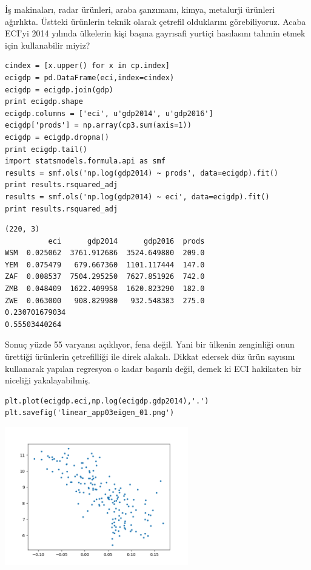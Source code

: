 \documentclass[12pt,fleqn]{article}\usepackage{../../common}
\begin{document}
İş makinaları, radar ürünleri, araba şanzımanı, kimya, metalurji ürünleri
ağırlıkta. Üstteki ürünlerin teknik olarak çetrefil olduklarını
görebiliyoruz. Acaba ECI'yi 2014 yılında ülkelerin kişi başına gayrısafi
yurtiçi hasılasını tahmin etmek için kullanabilir miyiz?

\begin{verbatim}
cindex = [x.upper() for x in cp.index]
ecigdp = pd.DataFrame(eci,index=cindex)
ecigdp = ecigdp.join(gdp)
print ecigdp.shape
ecigdp.columns = ['eci', u'gdp2014', u'gdp2016']
ecigdp['prods'] = np.array(cp3.sum(axis=1))
ecigdp = ecigdp.dropna()
print ecigdp.tail()
import statsmodels.formula.api as smf
results = smf.ols('np.log(gdp2014) ~ prods', data=ecigdp).fit()
print results.rsquared_adj
results = smf.ols('np.log(gdp2014) ~ eci', data=ecigdp).fit()
print results.rsquared_adj
\end{verbatim}

\begin{verbatim}
(220, 3)
          eci      gdp2014      gdp2016  prods
WSM  0.025062  3761.912686  3524.649880  209.0
YEM  0.075479   679.667360  1101.117444  147.0
ZAF  0.008537  7504.295250  7627.851926  742.0
ZMB  0.048409  1622.409958  1620.823290  182.0
ZWE  0.063000   908.829980   932.548383  275.0
0.230701679034
0.55503440264
\end{verbatim}

Sonuç yüzde 55 varyansı açıklıyor, fena değil. Yani bir ülkenin zenginliği
onun ürettiği ürünlerin çetrefilliği ile direk alakalı. Dikkat edersek düz
ürün sayısını kullanarak yapılan regresyon o kadar başarılı değil, demek ki
ECI hakikaten bir niceliği yakalayabilmiş.

\begin{verbatim}
plt.plot(ecigdp.eci,np.log(ecigdp.gdp2014),'.')
plt.savefig('linear_app03eigen_01.png')
\end{verbatim}

\includegraphics[height=6cm]{linear_app03eigen_01.png}
\end{document}
